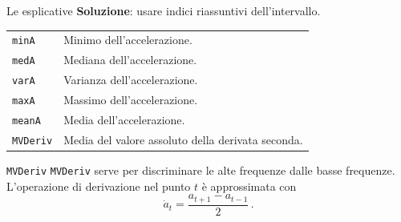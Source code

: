 \documentclass{beamer}
\begin{document}
\begin{frame}{Le esplicative}
\textbf{Soluzione}: usare indici riassuntivi dell'intervallo.
\begin{table}[H]
	\centering
	\begin{tabular}{ll}
		\texttt{minA}& Minimo dell'accelerazione.\\
		\texttt{medA}& Mediana dell'accelerazione.\\
		\texttt{varA}& Varianza dell'accelerazione.\\
		\texttt{maxA}& Massimo dell'accelerazione.\\
		\texttt{meanA}& Media dell'accelerazione.\\
		\texttt{MVDeriv}& Media del valore assoluto della derivata seconda.
	\end{tabular}
\end{table}
\end{frame}

\begin{frame}{\texttt{MVDeriv}}
\texttt{MVDeriv} serve per discriminare le alte frequenze dalle basse frequenze.\\
\bigskip
L'operazione di derivazione nel punto $t$ è approssimata con\cite{NumpyGradientNumPy}
\[
\dot{a}_t = \dfrac{a_{t + 1} - a_{t - 1}}{2}\,.
\]
\end{frame}
\end{document}
